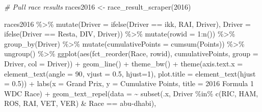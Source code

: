 \documentclass[
]{book}
\newenvironment{Shaded}{\begin{snugshade}}{\end{snugshade}}
\newcommand{\AttributeTok}[1]{\textcolor[rgb]{0.77,0.63,0.00}{#1}}
\newcommand{\CommentTok}[1]{\textcolor[rgb]{0.56,0.35,0.01}{\textit{#1}}}
\newcommand{\DecValTok}[1]{\textcolor[rgb]{0.00,0.00,0.81}{#1}}
\newcommand{\FloatTok}[1]{\textcolor[rgb]{0.00,0.00,0.81}{#1}}
\newcommand{\FunctionTok}[1]{\textcolor[rgb]{0.00,0.00,0.00}{#1}}
\newcommand{\NormalTok}[1]{#1}
\newcommand{\OtherTok}[1]{\textcolor[rgb]{0.56,0.35,0.01}{#1}}
\newcommand{\SpecialCharTok}[1]{\textcolor[rgb]{0.00,0.00,0.00}{#1}}
\newcommand{\StringTok}[1]{\textcolor[rgb]{0.31,0.60,0.02}{#1}}
\begin{document}
\begin{Shaded}
\begin{Highlighting}[]
\CommentTok{\# Pull race results}
\NormalTok{races2016 }\OtherTok{\textless{}{-}} \FunctionTok{race\_result\_scraper}\NormalTok{(}\DecValTok{2016}\NormalTok{)}

\NormalTok{races2016 }\SpecialCharTok{\%\textgreater{}\%}
  \FunctionTok{mutate}\NormalTok{(}\AttributeTok{Driver =} \FunctionTok{ifelse}\NormalTok{(Driver }\SpecialCharTok{==} \StringTok{\textquotesingle{}ikk\textquotesingle{}}\NormalTok{, }\StringTok{\textquotesingle{}RAI\textquotesingle{}}\NormalTok{, Driver),}
         \AttributeTok{Driver =} \FunctionTok{ifelse}\NormalTok{(Driver }\SpecialCharTok{==} \StringTok{\textquotesingle{}Resta\textquotesingle{}}\NormalTok{, }\StringTok{\textquotesingle{}DIV\textquotesingle{}}\NormalTok{, Driver)) }\SpecialCharTok{\%\textgreater{}\%} 
  \FunctionTok{mutate}\NormalTok{(}\AttributeTok{rowid =} \DecValTok{1}\SpecialCharTok{:}\FunctionTok{n}\NormalTok{()) }\SpecialCharTok{\%\textgreater{}\%}
  \FunctionTok{group\_by}\NormalTok{(Driver) }\SpecialCharTok{\%\textgreater{}\%} 
  \FunctionTok{mutate}\NormalTok{(}\AttributeTok{cumulativePoints =} \FunctionTok{cumsum}\NormalTok{(Points)) }\SpecialCharTok{\%\textgreater{}\%}
  \FunctionTok{ungroup}\NormalTok{() }\SpecialCharTok{\%\textgreater{}\%} 
  \FunctionTok{ggplot}\NormalTok{(}\FunctionTok{aes}\NormalTok{(}\FunctionTok{fct\_reorder}\NormalTok{(Race, rowid), cumulativePoints,}
         \AttributeTok{group =}\NormalTok{ Driver, }\AttributeTok{col =}\NormalTok{ Driver)) }\SpecialCharTok{+}
  \FunctionTok{geom\_line}\NormalTok{() }\SpecialCharTok{+}
  \FunctionTok{theme\_bw}\NormalTok{() }\SpecialCharTok{+} 
  \FunctionTok{theme}\NormalTok{(}\AttributeTok{axis.text.x =} \FunctionTok{element\_text}\NormalTok{(}\AttributeTok{angle =} \DecValTok{90}\NormalTok{, }\AttributeTok{vjust =} \FloatTok{0.5}\NormalTok{, }\AttributeTok{hjust=}\DecValTok{1}\NormalTok{),}
        \AttributeTok{plot.title =} \FunctionTok{element\_text}\NormalTok{(}\AttributeTok{hjust =} \FloatTok{0.5}\NormalTok{)) }\SpecialCharTok{+}
  \FunctionTok{labs}\NormalTok{(}\AttributeTok{x =} \StringTok{\textquotesingle{}Grand Prix\textquotesingle{}}\NormalTok{,}
       \AttributeTok{y =} \StringTok{\textquotesingle{}Cumulative Points\textquotesingle{}}\NormalTok{,}
       \AttributeTok{title =} \StringTok{\textquotesingle{}2016 Formula 1 WDC Race\textquotesingle{}}\NormalTok{) }\SpecialCharTok{+} \FunctionTok{geom\_text\_repel}\NormalTok{(}\AttributeTok{data =} \SpecialCharTok{\textasciitilde{}} \FunctionTok{subset}\NormalTok{(.x, Driver }\SpecialCharTok{\%in\%} \FunctionTok{c}\NormalTok{(}\StringTok{\textquotesingle{}RIC\textquotesingle{}}\NormalTok{, }\StringTok{\textquotesingle{}HAM\textquotesingle{}}\NormalTok{, }\StringTok{\textquotesingle{}ROS\textquotesingle{}}\NormalTok{, }\StringTok{\textquotesingle{}RAI\textquotesingle{}}\NormalTok{, }\StringTok{\textquotesingle{}VET\textquotesingle{}}\NormalTok{, }\StringTok{\textquotesingle{}VER\textquotesingle{}}\NormalTok{) }\SpecialCharTok{\&}\NormalTok{ Race }\SpecialCharTok{==} \StringTok{\textquotesingle{}abu{-}dhabi\textquotesingle{}}\NormalTok{),}

\end{Highlighting}
\end{Shaded}
\end{document}
